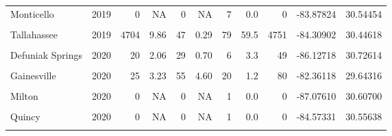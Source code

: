 \documentclass[12pt,final,CPage]{ufthesis}
\begin{document}
{\begin{table}[H]
{\begin{tabular}{lrrrrrrrrrr}
  Monticello & 2019 & 0 & NA & 0 & NA & 7 & 0.0 & 0 & -83.87824 & 30.54454\\
  \addlinespace
  \cellcolor{gray!6}{Quincy} & \cellcolor{gray!6}{2019} & \cellcolor{gray!6}{0} & \cellcolor{gray!6}{0.00} & \cellcolor{gray!6}{9} & \cellcolor{gray!6}{1.13} & \cellcolor{gray!6}{7} & \cellcolor{gray!6}{0.0} & \cellcolor{gray!6}{9} & \cellcolor{gray!6}{-84.60175} & \cellcolor{gray!6}{30.56986}\\
  Tallahassee & 2019 & 4704 & 9.86 & 47 & 0.29 & 79 & 59.5 & 4751 & -84.30902 & 30.44618\\
  \cellcolor{gray!6}{Baldwin} & \cellcolor{gray!6}{2020} & \cellcolor{gray!6}{27} & \cellcolor{gray!6}{1.31} & \cellcolor{gray!6}{15} & \cellcolor{gray!6}{1.55} & \cellcolor{gray!6}{4} & \cellcolor{gray!6}{6.8} & \cellcolor{gray!6}{42} & \cellcolor{gray!6}{-81.97352} & \cellcolor{gray!6}{30.30268}\\
  Defuniak Springs & 2020 & 20 & 2.06 & 29 & 0.70 & 6 & 3.3 & 49 & -86.12718 & 30.72614\\
  \cellcolor{gray!6}{Ferry Pass} & \cellcolor{gray!6}{2020} & \cellcolor{gray!6}{0} & \cellcolor{gray!6}{NA} & \cellcolor{gray!6}{0} & \cellcolor{gray!6}{NA} & \cellcolor{gray!6}{2} & \cellcolor{gray!6}{0.0} & \cellcolor{gray!6}{0} & \cellcolor{gray!6}{-87.21893} & \cellcolor{gray!6}{30.54415}\\
  \addlinespace
  Gainesville & 2020 & 25 & 3.23 & 55 & 4.60 & 20 & 1.2 & 80 & -82.36118 & 29.64316\\
  \cellcolor{gray!6}{Jacksonville} & \cellcolor{gray!6}{2020} & \cellcolor{gray!6}{66} & \cellcolor{gray!6}{1.13} & \cellcolor{gray!6}{41} & \cellcolor{gray!6}{1.67} & \cellcolor{gray!6}{8} & \cellcolor{gray!6}{8.2} & \cellcolor{gray!6}{107} & \cellcolor{gray!6}{-81.68811} & \cellcolor{gray!6}{30.39848}\\
  Milton & 2020 & 0 & NA & 0 & NA & 1 & 0.0 & 0 & -87.07610 & 30.60700\\
  \cellcolor{gray!6}{Orlando} & \cellcolor{gray!6}{2020} & \cellcolor{gray!6}{0} & \cellcolor{gray!6}{NA} & \cellcolor{gray!6}{0} & \cellcolor{gray!6}{NA} & \cellcolor{gray!6}{4} & \cellcolor{gray!6}{0.0} & \cellcolor{gray!6}{0} & \cellcolor{gray!6}{-81.51605} & \cellcolor{gray!6}{28.50670}\\
  Quincy & 2020 & 0 & NA & 0 & NA & 1 & 0.0 & 0 & -84.57331 & 30.55638\\
  \addlinespace
  \cellcolor{gray!6}{Tallahassee} & \cellcolor{gray!6}{2020} & \cellcolor{gray!6}{3364} & \cellcolor{gray!6}{4.82} & \cellcolor{gray!6}{1150} & \cellcolor{gray!6}{0.79} & \cellcolor{gray!6}{157} & \cellcolor{gray!6}{21.4} & \cellcolor{gray!6}{4514} & \cellcolor{gray!6}{-84.30878} & \cellcolor{gray!6}{30.44297}\\

\end{tabular}}
\end{table}}
\end{document}
